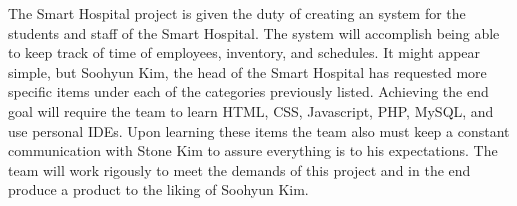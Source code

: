 The Smart Hospital project is given the duty of creating an system for the students and staff of the Smart Hospital. The system will accomplish being able to keep track of time of employees, inventory, and schedules. It might appear simple, but Soohyun Kim, the head of the Smart Hospital has requested more specific items under each of the categories previously listed. Achieving the end goal will require the team to learn HTML, CSS, Javascript, PHP, MySQL, and use personal IDEs. Upon learning these items the team also must keep a constant communication with Stone Kim to assure everything is to his expectations. The team will work rigously to meet the demands of this project and in the end produce a product to the liking of Soohyun Kim.